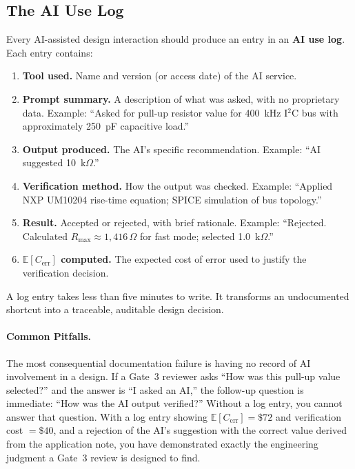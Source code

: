 \subsection{The AI Use Log}
\label{sec:ch8-log}

Every AI-assisted design interaction should produce an entry in an
\textbf{AI use log}.
Each entry contains:
\begin{enumerate}
  \item \textbf{Tool used.} Name and version (or access date) of the AI
        service.
  \item \textbf{Prompt summary.} A description of what was asked, with no
        proprietary data.
        Example: ``Asked for pull-up resistor value for 400~kHz I$^2$C bus
        with approximately 250~pF capacitive load.''
  \item \textbf{Output produced.} The AI's specific recommendation.
        Example: ``AI suggested 10~k$\Omega$.''
  \item \textbf{Verification method.} How the output was checked.
        Example: ``Applied NXP UM10204 rise-time equation; SPICE simulation of
        bus topology.''
  \item \textbf{Result.} Accepted or rejected, with brief rationale.
        Example: ``Rejected. Calculated $R_{\max} \approx 1{,}416\,\Omega$ for
        fast mode; selected 1.0~k$\Omega$.''
  \item \textbf{$\mathbb{E}[C_{\text{err}}]$ computed.} The expected cost of
        error used to justify the verification decision.
\end{enumerate}

A log entry takes less than five minutes to write.
It transforms an undocumented shortcut into a traceable, auditable design
decision.

\paragraph{Common Pitfalls.}
The most consequential documentation failure is having no record of AI
involvement in a design.
If a Gate~3 reviewer asks ``How was this pull-up value selected?'' and the
answer is ``I asked an AI,'' the follow-up question is immediate: ``How was
the AI output verified?''
Without a log entry, you cannot answer that question.
With a log entry showing $\mathbb{E}[C_{\text{err}}] = \$72$ and verification
cost $= \$40$, and a rejection of the AI's suggestion with the correct value
derived from the application note, you have demonstrated exactly the engineering
judgment a Gate~3 review is designed to find.

